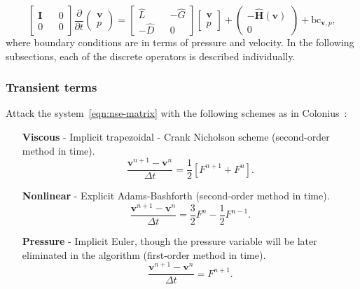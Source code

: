 \documentclass{article}
\begin{document}
\begin{equation}\label{eqn:nse-matrix}
            \begin{bmatrix}
                  \mathbf{I} && 0 \\ 
                  0 && 0
            \end{bmatrix}
            \frac{\partial }{\partial t} 
            \begin{pmatrix}
                  \boldsymbol{v} \\ 
                  p
            \end{pmatrix}
            =
            \begin{bmatrix}
                  \hat{L} && - \hat{G} \\ 
                  -\hat{D} && 0
            \end{bmatrix}
            \begin{bmatrix}
                  \boldsymbol{v} \\
                  p
            \end{bmatrix}
            +
            \begin{pmatrix}
                  -\mathbf{\hat{H}}(\boldsymbol{v})\\
                  0
            \end{pmatrix} + \text{bc}_{\boldsymbol{v},p},
        \end{equation}
where boundary conditions are in terms of pressure and velocity. In the following subsections, each of the discrete operators is described individually. 

\subsubsection{Transient terms}
Attack the system~\eqref{eqn:nse-matrix} with the following schemes as in Colonius~\cite{Colonius:2008}:
\begin{enumerate}
	\item[\textbf{Viscous}] - Implicit trapezoidal - Crank Nicholson scheme (second-order method in time).  
	\begin{equation}\label{eqn:crank-nicholson}
		\frac{\boldsymbol{v}^{n+1}-\boldsymbol{v}^n}{\Delta t}=\frac{1}{2}\left[F^{n+1}+F^n\right].
	\end{equation}

	\item[\textbf{Nonlinear}] - Explicit Adams-Bashforth (second-order method in time).
	\begin{equation}\label{eqn:adams-bashforth}
		\frac{\boldsymbol{v}^{n+1}-\boldsymbol{v}^{n}}{\Delta t} = \frac{3}{2}F^{n} - \frac{1}{2}F^{n-1}.
	\end{equation}

	\item[\textbf{Pressure}] - Implicit Euler, though the pressure variable will be later eliminated in the algorithm (first-order method in time). 
	\begin{equation}\label{eqn:implicit-euler} 
		\frac{\boldsymbol{v}^{n+1}-\boldsymbol{v}^{n}}{\Delta t} = F^{n+1}.
	\end{equation}
\end{enumerate}
\end{document}
